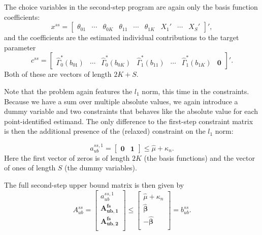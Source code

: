\documentclass[12pt,a4paper,english]{article} %
\numberwithin{equation}{section}
\numberwithin{figure}{section}
\numberwithin{table}{section}
\begin{document}
The choice variables in the second-step program are again only the basis function coefficients:
\begin{equation*}
  x^{ss} =
  \begin{bmatrix}
     \theta_{01} & \cdots & \theta_{0K} & \theta_{11} & \cdots & \theta_{1K} & X_1' & \cdots & X_S'
  \end{bmatrix}',
\end{equation*}
and the coefficients are the estimated individual contributions to the target parameter
\begin{equation*}
  c^{ss} =
  \begin{bmatrix}
     \hat{\Gamma}_0^*(b_{01}) & \cdots & \hat{\Gamma}_0^*(b_{0K}) & \hat{\Gamma}_1^*(b_{11}) & \cdots & \hat{\Gamma}_1^*(b_{1K}) & \mathbf{0}
  \end{bmatrix}'.
\end{equation*}
Both of these are vectors of length $2K + S$.

Note that the problem again features the $l_1$ norm, this time in the constraints.
Because we have a sum over multiple absolute values, we again introduce a dummy variable and two constraints that behaves like the absolute value for each point-identified estimand.
The only difference to the first-step constraint matrix is then the additional presence of the (relaxed) constraint on the $l_1$ norm:

\begin{equation*}
  a_{ub}^{ss, 1} = \begin{bmatrix}
    \mathbf{0} & \mathbf{1}
  \end{bmatrix}
  \leq \hat{\mu} + \kappa_n.
\end{equation*}
Here the first vector of zeros is of length $2K$ (the basis functions) and the vector of ones of length $S$ (the dummy variables).

The full second-step upper bound matrix is then given by
\begin{equation*}
  A_{ub}^{ss} = \begin{bmatrix}
    a_{ub}^{ss, 1} \\
    \mathbf{A_{ub,1}^{fs}} \\
    \mathbf{A_{ub,2}^{fs}} \\
  \end{bmatrix}
  \leq
  \begin{bmatrix}
    \hat{\mu} + \kappa_n \\
    \mathbf{\hat{\beta}} \\
    - \mathbf{\hat{\beta}} \\
  \end{bmatrix}
  = b_{ub}^{ss}.
\end{equation*}
\end{document}
